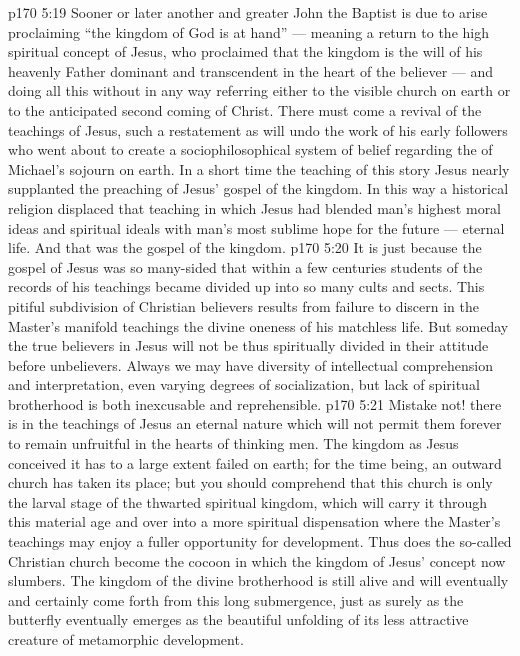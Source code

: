 \vs p170 5:19 Sooner or later another and greater John the Baptist is due to arise proclaiming “the kingdom of God is at hand” --- meaning a return to the high spiritual concept of Jesus, who proclaimed that the kingdom is the will of his heavenly Father dominant and transcendent in the heart of the believer --- and doing all this without in any way referring either to the visible church on earth or to the anticipated second coming of Christ. There must come a revival of the  teachings of Jesus, such a restatement as will undo the work of his early followers who went about to create a sociophilosophical system of belief regarding the  of Michael’s sojourn on earth. In a short time the teaching of this story  Jesus nearly supplanted the preaching of Jesus’ gospel of the kingdom. In this way a historical religion displaced that teaching in which Jesus had blended man’s highest moral ideas and spiritual ideals with man’s most sublime hope for the future --- eternal life. And that was the gospel of the kingdom.
\vs p170 5:20 It is just because the gospel of Jesus was so many\hyp{}sided that within a few centuries students of the records of his teachings became divided up into so many cults and sects. This pitiful subdivision of Christian believers results from failure to discern in the Master’s manifold teachings the divine oneness of his matchless life. But someday the true believers in Jesus will not be thus spiritually divided in their attitude before unbelievers. Always we may have diversity of intellectual comprehension and interpretation, even varying degrees of socialization, but lack of spiritual brotherhood is both inexcusable and reprehensible.
\vs p170 5:21 Mistake not! there is in the teachings of Jesus an eternal nature which will not permit them forever to remain unfruitful in the hearts of thinking men. The kingdom as Jesus conceived it has to a large extent failed on earth; for the time being, an outward church has taken its place; but you should comprehend that this church is only the larval stage of the thwarted spiritual kingdom, which will carry it through this material age and over into a more spiritual dispensation where the Master’s teachings may enjoy a fuller opportunity for development. Thus does the so\hyp{}called Christian church become the cocoon in which the kingdom of Jesus’ concept now slumbers. The kingdom of the divine brotherhood is still alive and will eventually and certainly come forth from this long submergence, just as surely as the butterfly eventually emerges as the beautiful unfolding of its less attractive creature of metamorphic development.
